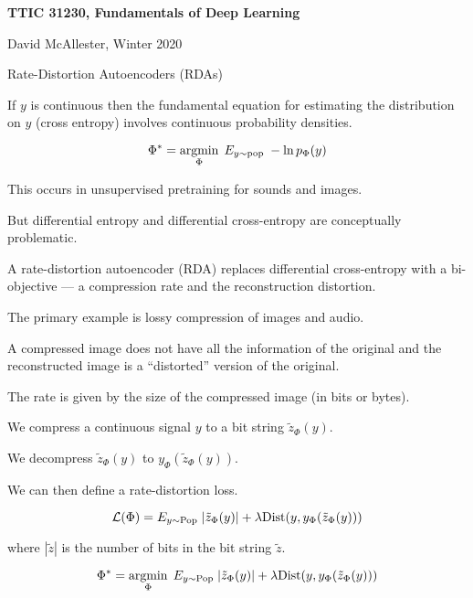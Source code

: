 





{\Huge

  \centerline{\bf TTIC 31230, Fundamentals of Deep Learning}
  \bigskip
  \centerline{David McAllester, Winter 2020}
  \vfill
  \centerline{Rate-Distortion Autoencoders (RDAs)}
  \vfill
  \vfill


If $y$ is continuous then the fundamental equation for estimating the distribution on $y$ (cross entropy) involves continuous probability densities.

\vfill
$$\Phi^* = \operatorname*{argmin}_\Phi \;E_{y \sim \mathrm{pop}}\;-\ln p_\Phi(y)$$

\vfill
This occurs in unsupervised pretraining for sounds and images.

\vfill
But differential entropy and differential cross-entropy are conceptually problematic.


A rate-distortion autoencoder (RDA) replaces differential cross-entropy with a bi-objective --- a compression rate and
the reconstruction distortion.

\vfill
The primary example is lossy compression of images and audio.

\vfill
A compressed image does not have all the information of the original and the reconstructed image is a ``distorted'' version of the original.

\vfill
The rate is given by the size of the compressed image (in bits or bytes).


We compress a continuous signal $y$ to a bit string $\tilde{z}_\Phi(y)$.

\vfill
We decompress $\tilde{z}_\Phi(y)$ to $y_\Phi(\tilde{z}_\Phi(y))$.

\vfill
We can then define a rate-distortion loss.

{\color{red} $${\cal L}(\Phi) = E_{y \sim \mathrm{Pop}}\;|\tilde{z}_\Phi(y)| + \lambda \mathrm{Dist}(y,y_\Phi(\tilde{z}_\Phi(y)))$$}

\vfill
where $|\tilde{z}|$ is the number of bits in the bit string $\tilde{z}$.


$$\Phi^* = \operatorname*{argmin}_\Phi\;E_{y \sim \mathrm{Pop}}\;|\tilde{z}_\Phi(y)| + \lambda \mathrm{Dist}(y,y_\Phi(\tilde{z}_\Phi(y)))$$

}
